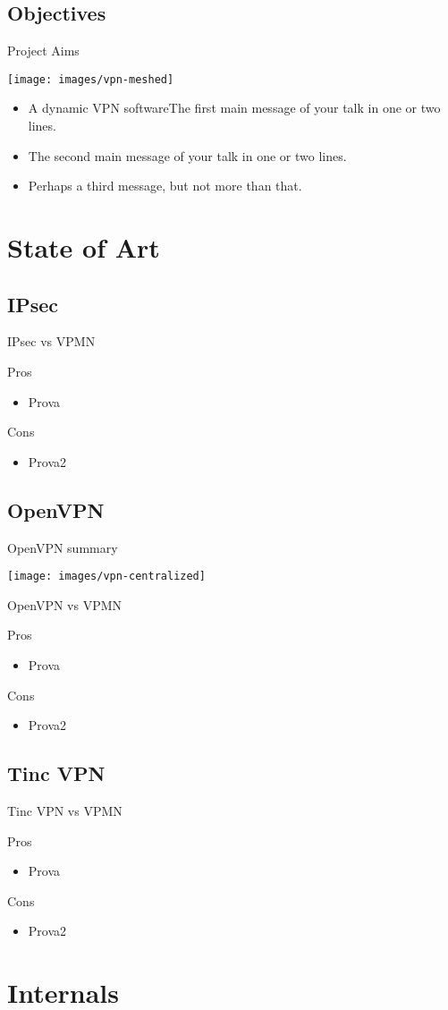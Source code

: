 \documentclass{beamer}
\newcommand*{\comparativeframe}[4]{
\begin{frame}{#1}
	#2
	\begin{block}{Pros}
		\begin{itemize}
		#3
		\end{itemize}
	\end{block}
	\begin{block}{Cons}
		\begin{itemize}
		#4
		\end{itemize}
	\end{block}
\end{frame}
}
\begin{document}
\subsection*{Objectives}
\begin{frame}{Project Aims}
	\begin{center}
	\texttt{[image: images/vpn-meshed]}
	\end{center}
	\begin{itemize}
	\item A dynamic VPN softwareThe \alert{first main message} of your talk in one or two lines.
	\item The \alert{second main message} of your talk in one or two lines.
	\item Perhaps a \alert{third message}, but not more than that.
	\end{itemize}
\end{frame}

\section{State of Art}
\subsection{IPsec}
\comparativeframe{IPsec vs VPMN}{}
{
\item Prova
}{
\item Prova2
}
\subsection{OpenVPN}
\begin{frame}{OpenVPN summary}
	\begin{center}
	\texttt{[image: images/vpn-centralized]}
	\end{center}
\end{frame}
\comparativeframe{OpenVPN vs VPMN}{}{
\item Prova
}{
\item Prova2
}
\subsection{Tinc VPN}
\comparativeframe{Tinc VPN vs VPMN}{}
{
\item Prova
}{
\item Prova2
}

\section{Internals}
\end{document}
